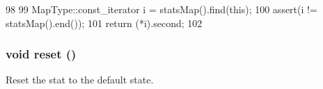 \begin{DoxyCode}
98 {
99     MapType::const_iterator i = statsMap().find(this);
100     assert(i != statsMap().end());
101     return (*i).second;
102 }
\end{DoxyCode}
\hypertarget{classStats_1_1InfoAccess_ad20897c5c8bd47f5d4005989bead0e55}{
\subsubsection[{reset}]{\setlength{\rightskip}{0pt plus 5cm}void reset ()}}
\label{classStats_1_1InfoAccess_ad20897c5c8bd47f5d4005989bead0e55}
Reset the stat to the default state. 

